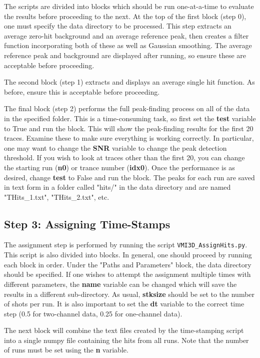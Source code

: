 \documentclass[12pt]{article}
\begin{document}
The scripts are divided into blocks which should be run one-at-a-time to evaluate the results before proceeding to the next.
At the top of the first block (step 0), one must specify the data directory to be processed.
This step extracts an average zero-hit background and an average reference peak, then creates a filter function incorporating both of these as well as Gaussian smoothing.
The average reference peak and background are displayed after running, so ensure these are acceptable before proceeding.

The second block (step 1) extracts and displays an average single hit function.
As before, ensure this is acceptable before proceeding.

The final block (step 2) performs the full peak-finding process on all of the data in the specified folder.
This is a time-consuming task, so first set the \textbf{test} variable to True and run the block.
This will show the peak-finding results for the first 20 traces.
Examine these to make sure everything is working correctly.
In particular, one may want to change the \textbf{SNR} variable to change the peak detection threshold.
If you wish to look at traces other than the first 20, you can change the starting run (\textbf{n0}) or trance number (\textbf{idx0}).
Once the performance is as desired, change \textbf{test} to False and run the block.
The peaks for each run are saved in text form in a folder called "hits/" in the data directory and are named "THits\_1.txt", "THits\_2.txt", etc.

\subsection{Step 3: Assigning Time-Stamps}

The assignment step is performed by running the script \texttt{VMI3D\_AssignHits.py}.
This script is also divided into blocks.
In general, one should proceed by running each block in order.
Under the "Paths and Parameters" block, the data directory should be specified.
If one wishes to attempt the assignment multiple times with different parameters, the \textbf{name} variable can be changed which will save the results in a different sub-directory.
As usual, \textbf{stksize} should be set to the number of shots per run.
It is also important to set the \textbf{dt} variable to the correct time step (0.5 for two-channel data, 0.25 for one-channel data).

The next block will combine the text files created by the time-stamping script into a single numpy file containing the hits from all runs.
Note that the number of runs must be set using the \textbf{n} variable.
\end{document}
